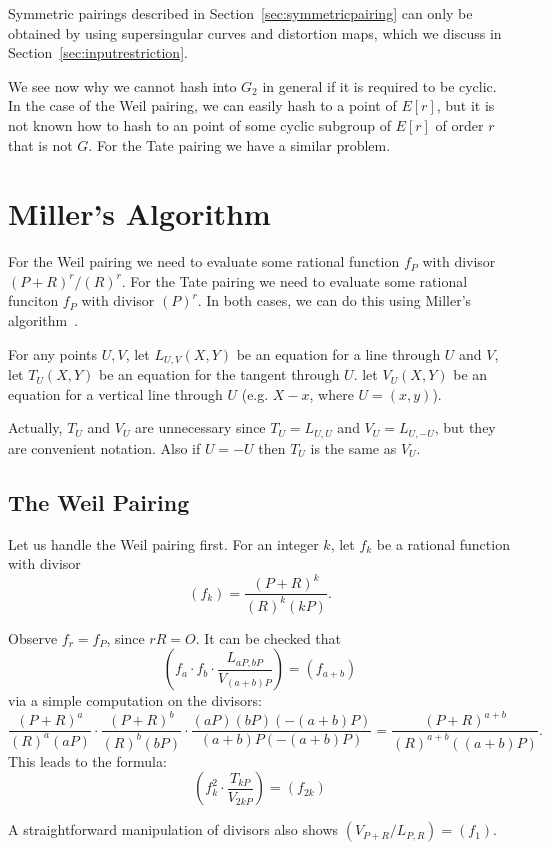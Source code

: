 Symmetric pairings described in Section~\ref{sec:symmetricpairing} can only
be obtained by using supersingular curves and distortion maps, which
we discuss in Section~\ref{sec:inputrestriction}.

We see now why we cannot hash into $G_2$ in general if it is required
to be cyclic.
In the case of the Weil pairing, we can easily hash to a point of $E[r]$,
but it is not known how to hash to an point of
some cyclic subgroup of $E[r]$ of order $r$ that is not $G$. 
For the Tate pairing we have a similar problem.

\section {Miller's Algorithm}

For the Weil pairing we need to evaluate some rational function
$f_P$ with divisor $(P+R)^r /(R)^r$.
For the Tate pairing we need to evaluate some rational funciton
$f_P$ with divisor $(P)^r$.
In both cases, we can do this using Miller's algorithm~\cite{miller}.

For any points $U, V$,
let $L_{U,V}(X,Y)$ be an equation for a line through $U$ and $V$,
let $T_{U}(X,Y)$ be an equation for the tangent through $U$.
let
$V_{U}(X,Y)$ be an equation for a vertical line through $U$ (e.g.
$X - x$, where $U = (x, y)$).

Actually, $T_U$ and $V_U$ are unnecessary since
$T_U = L_{U,U}$ and $V_U = L_{U,-U}$, but they are convenient notation.
Also if $U = -U$ then $T_U$ is the same as $V_U$.

\subsection {The Weil Pairing}

Let us handle the Weil pairing first. For an integer $k$, let
$f_k$ be a rational function with divisor
\[
(f_k) = \frac{(P+R)^k}{(R)^k(kP)} .
\]

Observe $f_r = f_P$, since $rR = O$.
It can be checked that
\[
\left(
f_a \cdot f_b \cdot \frac{L_{aP,bP}}{V_{(a+b)P}}
\right) = (f_{a+b})
\]
via a simple computation on the divisors:
\[
\frac{(P+R)^a}{(R)^a(aP)}
\cdot
\frac{(P+R)^b}{(R)^b(bP)}
\cdot
\frac{(aP)(bP)(-(a+b)P)}{(a+b)P(-(a+b)P)}
=
\frac{(P+R)^{a+b}}{(R)^{a+b}((a+b)P)} .
\]
This leads to the formula:
\[
\left(
f_k^2 \cdot \frac{T_{kP}}{V_{2kP}}
\right) = (f_{2k})
\]

A straightforward manipulation of divisors also shows
$( V_{P+R} / L_{P,R}) = (f_1)$.

